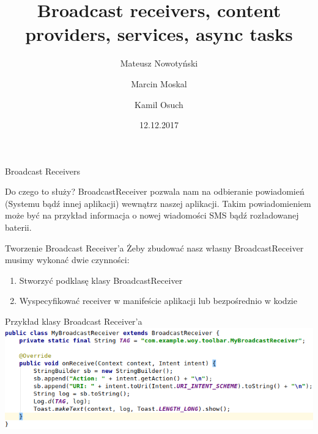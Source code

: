 \documentclass{beamer}
\title[Technologie mobilne]{Broadcast receivers, content providers, services, async tasks}
\author[M. Nowotyński, M.Moskal, K. Osuch]{Mateusz Nowotyński \and Marcin Moskal \and Kamil Osuch}
\date[12.12.2017]{12.12.2017}
\begin{document}
{
 \begin{frame}
   \titlepage
 \end{frame}
}



\begin{frame}{Broadcast Receivers}

\begin{block}{Do czego to służy?}
	BroadcastReceiver pozwala nam na odbieranie powiadomień (Systemu bądź innej aplikacji) wewnątrz naszej aplikacji. Takim powiadomieniem może być na przykład informacja o nowej wiadomości SMS bądź rozładowanej baterii.
\end{block}
\end{frame}


\begin{frame}{Tworzenie Broadcast Receiver'a}
	Żeby zbudować nasz własny BroadcastReceiver musimy wykonać dwie czynności:
	\begin{enumerate}
		\item Stworzyć podklasę klasy BroadcastReceiver
		\item Wyspecyfikować receiver w manifeście aplikacji lub bezpośrednio w kodzie
	\end{enumerate}
\end{frame}


\begin{frame}{Przykład klasy Broadcast Receiver'a}
	\includegraphics[width=\textwidth]{receiver}
\end{frame}
\end{document}
